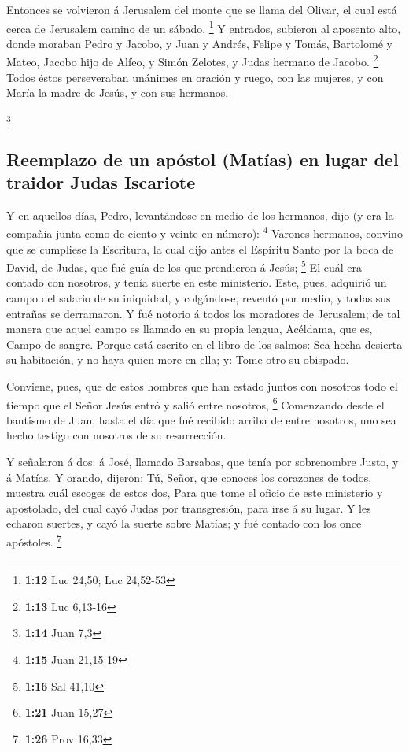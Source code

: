  Entonces se volvieron á Jerusalem del monte que se llama
del Olivar, el cual está cerca de Jerusalem camino de un sábado.
\footnote{\textbf{1:12} Luc 24,50; Luc 24,52-53}  Y
entrados, subieron al aposento alto, donde moraban Pedro y Jacobo, y
Juan y Andrés, Felipe y Tomás, Bartolomé y Mateo, Jacobo hijo de Alfeo,
y Simón Zelotes, y Judas hermano de Jacobo. \footnote{\textbf{1:13} Luc
  6,13-16}  Todos éstos perseveraban unánimes en oración
y ruego, con las mujeres, y con María la madre de Jesús, y con sus
hermanos.

\footnote{\textbf{1:14} Juan 7,3}

\hypertarget{reemplazo-de-un-apuxf3stol-matuxedas-en-lugar-del-traidor-judas-iscariote}{%
\subsection{Reemplazo de un apóstol (Matías) en lugar del traidor Judas
Iscariote}\label{reemplazo-de-un-apuxf3stol-matuxedas-en-lugar-del-traidor-judas-iscariote}}

 Y en aquellos días, Pedro, levantándose en medio de los
hermanos, dijo (y era la compañía junta como de ciento y veinte en
número): \footnote{\textbf{1:15} Juan 21,15-19}  Varones
hermanos, convino que se cumpliese la Escritura, la cual dijo antes el
Espíritu Santo por la boca de David, de Judas, que fué guía de los que
prendieron á Jesús; \footnote{\textbf{1:16} Sal 41,10} 
El cuál era contado con nosotros, y tenía suerte en este ministerio.
 Este, pues, adquirió un campo del salario de su
iniquidad, y colgándose, reventó por medio, y todas sus entrañas se
derramaron.  Y fué notorio á todos los moradores de
Jerusalem; de tal manera que aquel campo es llamado en su propia lengua,
Acéldama, que es, Campo de sangre.  Porque está escrito
en el libro de los salmos: Sea hecha desierta su habitación, y no haya
quien more en ella; y: Tome otro su obispado.

 Conviene, pues, que de estos hombres que han estado
juntos con nosotros todo el tiempo que el Señor Jesús entró y salió
entre nosotros, \footnote{\textbf{1:21} Juan 15,27} 
Comenzando desde el bautismo de Juan, hasta el día que fué recibido
arriba de entre nosotros, uno sea hecho testigo con nosotros de su
resurrección.

 Y señalaron á dos: á José, llamado Barsabas, que tenía
por sobrenombre Justo, y á Matías.  Y orando, dijeron:
Tú, Señor, que conoces los corazones de todos, muestra cuál escoges de
estos dos,  Para que tome el oficio de este ministerio y
apostolado, del cual cayó Judas por transgresión, para irse á su lugar.
 Y les echaron suertes, y cayó la suerte sobre Matías; y
fué contado con los once apóstoles. \footnote{\textbf{1:26} Prov 16,33}

